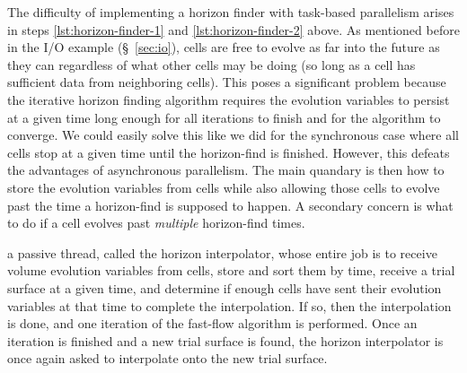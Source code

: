 \begin{bibunit}[unsrtnat]
The difficulty of implementing a horizon finder with task-based parallelism
arises in steps \ref{lst:horizon-finder-1} and \ref{lst:horizon-finder-2} above.
As mentioned before in the I/O example (\S~\ref{sec:io}), cells are free to
evolve as far into the future as they can regardless of what other cells may be
doing (so long as a cell has sufficient data from neighboring cells). This
poses a significant problem because the iterative horizon finding algorithm
requires the evolution variables to persist at a given time long
enough for all iterations to finish and for the algorithm to converge. We could
easily solve this like we did for the synchronous case where all cells stop at a
given time until the horizon-find is finished. However, this defeats
the advantages of asynchronous parallelism. The main quandary is then how to
store the evolution variables from cells while also allowing those cells to
evolve past the time a horizon-find is supposed to happen. A secondary concern
is what to do if a cell evolves past \textit{multiple} horizon-find times.

 a passive
thread, called the horizon interpolator, whose entire job is to receive volume
evolution variables from cells, store and sort them by time, receive a trial
surface at a given time, and determine if enough cells have sent their evolution
variables at that time to complete the interpolation. If so, then the
interpolation is done, and one iteration of the fast-flow algorithm is
performed. Once an iteration is finished and a new trial surface is found, the
horizon interpolator is once again asked to interpolate onto the new trial
surface.


\end{bibunit}
